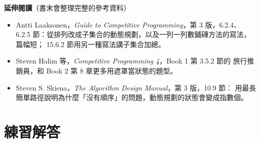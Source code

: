 \textbf{延伸閱讀}（書末會整理完整的參考資料）

\begin{itemize}
\item Antti Laaksonen，\textit{Guide to Competitive Programming}，第 3 版，6.2.4、
6.2.5 節：從排列改成子集合的動態規劃，以及一列一列數鋪磚方法的寫法，篇幅短；
15.6.2 節用另一種寫法講子集合加總。
\item Steven Halim 等，\textit{Competitive Programming 4}，Book 1 第 3.5.2 節的
旅行推銷員，和 Book 2 第 8 章更多用遮罩當狀態的題型。
\item Steven S. Skiena，\textit{The Algorithm Design Manual}，第 3 版，10.9 節：
用最長簡單路徑說明為什麼「沒有順序」的問題，動態規劃的狀態會變成指數個。
\end{itemize}

\section*{練習解答}

